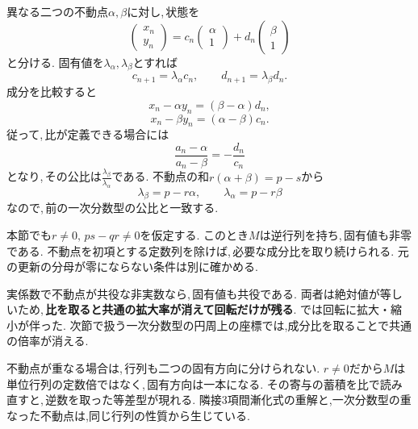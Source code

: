 異なる二つの不動点$\alpha,\beta$に対し,\,状態を
\[
 \begin{pmatrix}x_n\\y_n\end{pmatrix}
 =c_n\begin{pmatrix}\alpha\\1\end{pmatrix}
 +d_n\begin{pmatrix}\beta\\1\end{pmatrix}
\]
と分ける. 固有値を$\lambda_\alpha,\lambda_\beta$とすれば
\[
 c_{n+1}=\lambda_\alpha c_n,\qquad
 d_{n+1}=\lambda_\beta d_n.
\]
成分を比較すると
\[
 x_n-\alpha y_n=(\beta-\alpha)d_n,
\]
\[
 x_n-\beta y_n=(\alpha-\beta)c_n.
\]
従って,\,比が定義できる場合には
\[
 \frac{a_n-\alpha}{a_n-\beta}=-\frac{d_n}{c_n}
\]
となり,\,その公比は$\frac{\lambda_\beta}{\lambda_\alpha}$である.
不動点の和$r(\alpha+\beta)=p-s$から
\[
 \lambda_\beta=p-r\alpha,\qquad
 \lambda_\alpha=p-r\beta
\]
なので,\,前の一次分数型の公比と一致する.

本節でも$r\ne0,\,ps-qr\ne0$を仮定する.
このとき$M$は逆行列を持ち,\,固有値も非零である.
不動点を初項とする定数列を除けば,\,必要な成分比を取り続けられる.
元の更新の分母が零にならない条件は別に確かめる.

実係数で不動点が共役な非実数なら,\,固有値も共役である.
両者は絶対値が等しいため,\,\textbf{比を取ると共通の拡大率が消えて回転だけが残る}.
では回転に拡大・縮小が伴った. 次節で扱う一次分数型の円周上の座標では,成分比を取ることで共通の倍率が消える.

不動点が重なる場合は,\,行列も二つの固有方向に分けられない.
$r\ne0$だから$M$は単位行列の定数倍ではなく,\,固有方向は一本になる.
その寄与の蓄積を比で読み直すと,\,逆数を取った等差型が現れる.
隣接3項間漸化式の重解と,一次分数型の重なった不動点は,同じ行列の性質から生じている.
